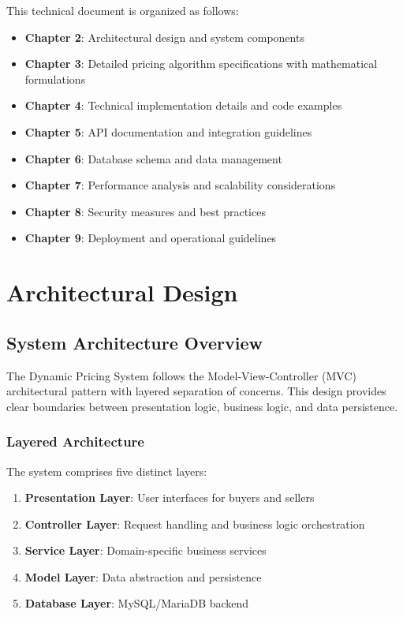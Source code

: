 \documentclass[12pt,a4paper,oneside]{report}
\begin{document}
This technical document is organized as follows:

\begin{itemize}
    \item \textbf{Chapter 2}: Architectural design and system components
    \item \textbf{Chapter 3}: Detailed pricing algorithm specifications with mathematical formulations
    \item \textbf{Chapter 4}: Technical implementation details and code examples
    \item \textbf{Chapter 5}: API documentation and integration guidelines
    \item \textbf{Chapter 6}: Database schema and data management
    \item \textbf{Chapter 7}: Performance analysis and scalability considerations
    \item \textbf{Chapter 8}: Security measures and best practices
    \item \textbf{Chapter 9}: Deployment and operational guidelines
\end{itemize}

\newpage

\chapter{Architectural Design}

\section{System Architecture Overview}

The Dynamic Pricing System follows the Model-View-Controller (MVC) architectural pattern with layered separation of concerns. This design provides clear boundaries between presentation logic, business logic, and data persistence.

\subsection{Layered Architecture}

The system comprises five distinct layers:

\begin{enumerate}
    \item \textbf{Presentation Layer}: User interfaces for buyers and sellers
    \item \textbf{Controller Layer}: Request handling and business logic orchestration
    \item \textbf{Service Layer}: Domain-specific business services
    \item \textbf{Model Layer}: Data abstraction and persistence
    \item \textbf{Database Layer}: MySQL/MariaDB backend
\end{enumerate}
\end{document}
